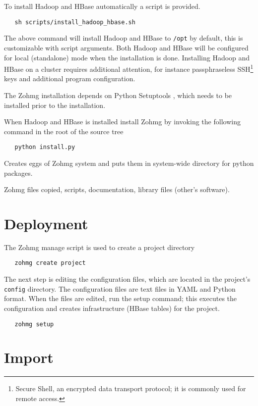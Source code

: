 To install Hadoop and HBase automatically a script is provided.

\begin{verbatim}
   sh scripts/install_hadoop_hbase.sh
\end{verbatim}

The above command will install Hadoop and HBase to \texttt{/opt} by default,
this is customizable with script arguments. Both Hadoop and HBase will be
configured for local (standalone) mode when the installation is done. Installing
Hadoop and HBase on a cluster requires additional attention, for
instance passphraseless SSH\footnote{Secure Shell, an encrypted data transport
protocol; it is commonly used for remote access.} keys and additional program
configuration.

The Zohmg installation depends on Python Setuptools \cite{setuptools}, which
needs to be installed prior to the installation.

When Hadoop and HBase is installed install Zohmg by invoking the following
command in the root of the source tree

\begin{verbatim}
   python install.py
\end{verbatim}

Creates eggs of Zohmg system and puts them in system-wide directory for python
packages.

Zohmg files copied, scripts, documentation, library files (other's software).


\section*{Deployment}

The Zohmg manage script is used to create a project directory

\begin{verbatim}
   zohmg create project
\end{verbatim}

\noindent The next step is editing the configuration files, which are located in
the project's \texttt{config} directory. The configuration files are text files
in YAML and Python format. When the files are edited, run the setup command;
this executes the configuration and creates infrastructure (HBase tables) for
the project.

\begin{verbatim}
   zohmg setup
\end{verbatim}


\section*{Import}

